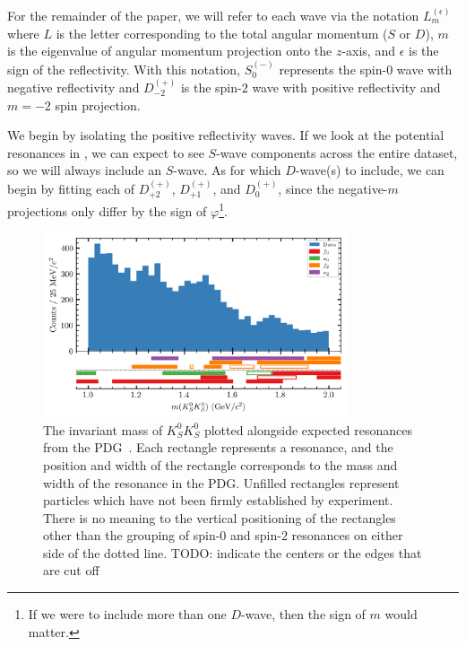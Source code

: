 For the remainder of the paper, we will refer to each wave via the notation $L_m^{(\epsilon)}$ where $L$ is the letter corresponding to the total angular momentum ($S$ or $D$), $m$ is the eigenvalue of angular momentum projection onto the $z$-axis, and $\epsilon$ is the sign of the reflectivity. With this notation, $S_0^{(-)}$ represents the spin-$0$ wave with negative reflectivity and $D_{-2}^{(+)}$ is the spin-$2$ wave with positive reflectivity and $m=-2$ spin projection.

We begin by isolating the positive reflectivity waves. If we look at the potential resonances in , we can expect to see $S$-wave components across the entire dataset, so we will always include an $S$-wave. As for which $D$-wave(s) to include, we can begin by fitting each of $D_{+2}^{(+)}$, $D_{+1}^{(+)}$, and $D_{0}^{(+)}$, since the negative-$m$ projections only differ by the sign of $\varphi$\footnote{If we were to include more than one $D$-wave, then the sign of $m$ would matter.}.

\begin{figure}
  \begin{center}
    \includegraphics[width=0.8\textwidth]{figures/mass_pdg_data_accpol_chisqdof_3.4_splot_D_1s_2b.png}
  \end{center}
  \caption{The invariant mass of $K_S^0K_S^0$ plotted alongside expected resonances from the PDG~\cite{Zyla2020}. Each rectangle represents a resonance, and the position and width of the rectangle corresponds to the mass and width of the resonance in the PDG. Unfilled rectangles represent particles which have not been firmly established by experiment. There is no meaning to the vertical positioning of the rectangles other than the grouping of spin-$0$ and spin-$2$ resonances on either side of the dotted line. {\color{red}TODO: indicate the centers or the edges that are cut off}}\label{fig:mass-with-pdg}
\end{figure}

